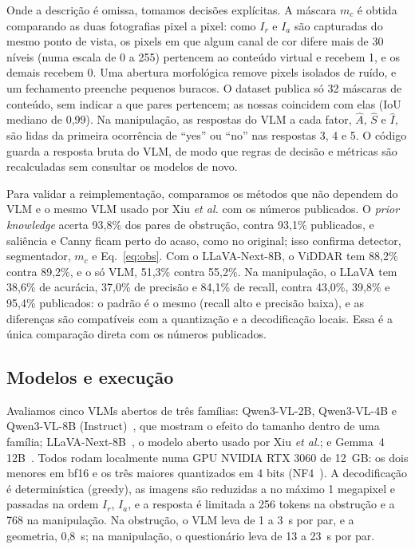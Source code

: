 \documentclass[conference]{IEEEtran}
\newcommand{\Ir}{I_r}
\newcommand{\Ia}{I_a}
\begin{document}
Onde a descrição é omissa, tomamos decisões explícitas. A máscara $m_c$ é obtida comparando as duas
fotografias pixel a pixel: como $\Ir$ e $\Ia$ são capturadas do mesmo ponto de vista, os pixels em que
algum canal de cor difere mais de 30 níveis (numa escala de 0 a 255) pertencem ao conteúdo virtual e
recebem 1, e os demais recebem 0. Uma abertura morfológica remove pixels isolados de ruído, e um
fechamento preenche pequenos buracos. O dataset publica só 32 máscaras de conteúdo, sem indicar a que
pares pertencem; as nossas coincidem com elas (IoU mediano de 0,99). Na manipulação, as respostas do VLM
a cada fator, $\hat A$, $\hat S$ e $\hat I$, são lidas da primeira ocorrência de ``yes'' ou ``no'' nas
respostas 3, 4 e 5. O código guarda a resposta bruta do VLM, de modo que regras de decisão e métricas são
recalculadas sem consultar os modelos de novo.

Para validar a reimplementação, comparamos os métodos que não dependem do VLM e o mesmo VLM usado por Xiu \emph{et al.}
com os números publicados. O \emph{prior knowledge} acerta 93,8\% dos pares de obstrução, contra 93,1\%
publicados, e saliência e Canny ficam perto do acaso, como no original; isso confirma detector,
segmentador, $m_c$ e Eq.~\eqref{eq:obs}. Com o LLaVA-Next-8B, o ViDDAR tem 88,2\% contra 89,2\%, e o
só VLM, 51,3\% contra 55,2\%. Na manipulação, o LLaVA tem 38,6\% de acurácia, 37,0\% de precisão e
84,1\% de recall, contra 43,0\%, 39,8\% e 95,4\% publicados: o padrão é o mesmo (recall alto e precisão
baixa), e as diferenças são compatíveis com a quantização e a decodificação locais. Essa é a única
comparação direta com os números publicados.

\subsection{Modelos e execução}
Avaliamos cinco VLMs abertos de três famílias: Qwen3-VL-2B, Qwen3-VL-4B e Qwen3-VL-8B
(Instruct)~\cite{qwen3vl}, que mostram o efeito do tamanho dentro de uma família; LLaVA-Next-8B~\cite{llava},
o modelo aberto usado por Xiu \emph{et al.}; e Gemma~4 12B~\cite{gemma4}. Todos rodam localmente numa
GPU NVIDIA RTX 3060 de 12~GB: os dois menores em bf16 e os três maiores quantizados em 4 bits
(NF4~\cite{qlora}). A decodificação é determinística (greedy), as imagens são reduzidas a no máximo 1
megapixel e passadas na ordem $\Ir$, $\Ia$, e a resposta é limitada a 256 tokens na obstrução e a 768 na manipulação. Na obstrução, o VLM
leva de 1 a 3~s por par, e a geometria, 0,8~s; na manipulação, o questionário leva de 13 a 23~s por par.
\end{document}
